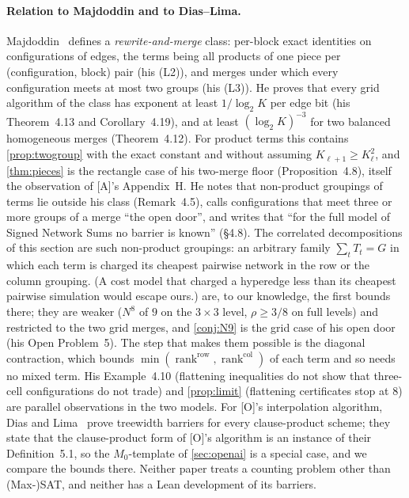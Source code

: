 \documentclass[10pt]{amsart}
\theoremstyle{plain}
\theoremstyle{definition}
\theoremstyle{remark}
\numberwithin{equation}{section}
\newcommand{\A}{\textup{[A]}}
\newcommand{\Oa}{\textup{[O]}}
\newcommand{\rk}{\operatorname{rank}}
\begin{document}
\paragraph{Relation to Majdoddin and to Dias--Lima.} Majdoddin~\cite{Maj26} defines a
\emph{rewrite-and-merge} class: per-block exact identities on configurations of edges, the terms being
all products of one piece per (configuration, block) pair (his (L2)), and merges under which every
configuration meets at most two groups (his (L3)). He proves that every grid algorithm of the class
has exponent at least $1/\log_2K$ per edge bit (his Theorem~4.13 and Corollary~4.19), and at least
$(\log_2K)^{-3}$ for two balanced homogeneous merges (Theorem~4.12). For product terms this contains
\cref{prop:twogroup} with the exact constant and without assuming $K_{\ell+1}\ge K_\ell^2$, and
\cref{thm:pieces} is the rectangle case of his two-merge floor (Proposition~4.8), itself the observation
of \A's Appendix~H. He notes that non-product groupings of terms lie outside his class (Remark~4.5),
calls configurations that meet three or more groups of a merge ``the open door'', and writes that
``for the full model of Signed Network Sums no barrier is known'' (\S4.8). The correlated
decompositions of this section are such non-product groupings: an arbitrary family $\sum_tT_t=G$ in
which each term is charged its cheapest pairwise network in the row or the column grouping. (A cost
model that charged a hyperedge less than its cheapest pairwise simulation would escape ours.)
 are, to our knowledge, the first bounds there; they
are weaker ($N^8$ of $9$ on the $3\times3$ level, $\rho\ge3/8$ on full levels) and restricted to the two
grid merges, and \cref{conj:N9} is the grid case of his open door (his Open Problem~5). The step that
makes them possible is the diagonal contraction, which bounds $\min(\rk^{\mathrm{row}},\rk^{\mathrm{col}})$
of each term and so needs no mixed term. His Example~4.10 (flattening inequalities do not show that
three-cell configurations do not trade) and \cref{prop:limit} (flattening certificates stop at $8$) are
parallel observations in the two models. For \Oa's interpolation algorithm, Dias and
Lima~\cite{DL26} prove treewidth barriers for every clause-product scheme; they state that the
clause-product form of \Oa's algorithm is an instance of their Definition~5.1, so the $M_0$-template of
\cref{sec:openai} is a special case, and we compare the bounds there. Neither paper treats a counting problem other than
(Max-)SAT, and neither has a Lean development of its barriers.
\end{document}
